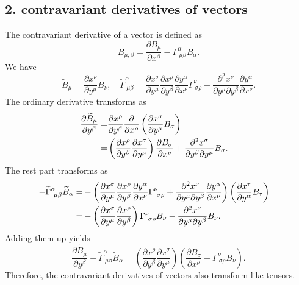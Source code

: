 \documentclass{article}
\begin{document}
\subsection*{2. contravariant derivatives of vectors}
The contravariant derivative of a vector is defined as
\begin{equation}
B_{\mu;\beta}=\frac{\partial B_\mu}{\partial x^\beta}-\Gamma^\alpha_{~\mu \beta}B_\alpha.
\end{equation}
We have 
\begin{equation}
\widetilde{B}_\mu = \frac{\partial x^\nu}{\partial y^\mu}B_\nu,\quad
\widetilde{\Gamma}^\alpha_{~\mu\beta} = \frac{\partial x^\sigma}{\partial y^\mu}\frac{\partial x^\rho}{\partial y^\beta} \frac{\partial y^\alpha}{\partial x^\nu}\Gamma^\nu_{~\sigma \rho}
+\frac{\partial^2 x^\nu}{\partial y^\mu \partial y^\beta} \frac{\partial y^\alpha}{\partial x^\nu}.
\end{equation}
The ordinary derivative transforms as
\begin{align}
\frac{\partial \widetilde{B}_\mu}{\partial y^\beta}
=&\frac{\partial x^\rho}{\partial y^\beta}\frac{\partial}{\partial x^\rho}
\left(
\frac{\partial x^\sigma}{\partial y^\mu}B_\sigma
\right)\cr
=&\left(\frac{\partial x^\rho}{\partial y^\beta}\frac{\partial x^\sigma}{\partial y^\mu}\right)\frac{\partial B_\sigma}{\partial x^\rho}
+\frac{\partial^2 x^\sigma}{\partial y^\beta \partial y^\mu}B_\sigma.
\end{align}
The rest part transforms as
\begin{align}
-\widetilde{\Gamma}^\alpha_{~\mu \beta}\widetilde{B}_\alpha
=&-\left(\frac{\partial x^\sigma}{\partial y^\mu}\frac{\partial x^\rho}{\partial y^\beta} \frac{\partial y^\alpha}{\partial x^\nu}\Gamma^\nu_{~\sigma \rho}
+\frac{\partial^2 x^\nu}{\partial y^\mu \partial y^\beta} \frac{\partial y^\alpha}{\partial x^\nu}\right)
\left(
\frac{\partial x^\tau}{\partial y^\alpha}B_\tau
\right)\cr
=&-\left(\frac{\partial x^\sigma}{\partial y^\mu}\frac{\partial x^\rho}{\partial y^\beta}\right)\Gamma^\nu_{~\sigma \rho}B_\nu
-\frac{\partial^2 x^\nu}{\partial y^\mu \partial y^\beta}B_\nu.
\end{align}
Adding them up yields
\begin{equation}
\frac{\partial \widetilde{B}_\mu}{\partial y^\beta}-\widetilde{\Gamma}^\alpha_{~\mu \beta}\widetilde{B}_\alpha
= \left(\frac{\partial x^\rho}{\partial y^\beta}\frac{\partial x^\sigma}{\partial y^\mu}\right)
\left(\frac{\partial B_\sigma}{\partial x^\rho}-\Gamma^\nu_{~\sigma \rho}B_\nu\right).
\end{equation}
Therefore, the contravariant derivatives of vectors also transform like tensors.
\end{document}
